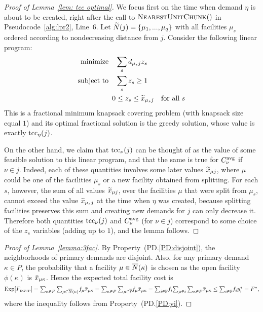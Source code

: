 \documentclass[11pt]{article}
\begin{document}

\begin{proof}[Proof of Lemma~\ref{lem: tcc optimal}]
  We focus first on the time when demand $\eta$ is about to be created,
  right after the call to ${\textsc{NearestUnitChunk}}()$ in
  Pseudocode~\ref{alg:lpr2}, Line~6.  Let ${\widetilde N}(j) =
  \{\mu_1,...,\mu_q\}$ with all facilities $\mu_s$ ordered
  according to nondecreasing distance from $j$.  Consider
  the following linear program:
%
\begin{alignat*}{1}
	\textrm{minimize} \quad & \sum_s d_{\mu_s j}z_s
			\\
	\textrm{subject to} \quad & \sum_s z_s  \ge 1
			\\
 	0 &\le z_s \le {\widetilde x}_{\mu_s j} \quad \textrm{for all}\ s
\end{alignat*}
%
  This is a fractional
  minimum knapsack covering problem (with knapsack size equal $1$) and its optimal fractional
  solution is the greedy solution, whose value is exactly
  $\textrm{tcc}_\eta(j)$.  

On the other hand, we claim that
  $\textrm{tcc}_\nu(j)$ can be thought of as the value of some feasible
  solution to this linear program, and that the same is true for $C^{{\mbox{\scriptsize\rm avg}}}_{\nu}$ if $\nu\in j$.
  Indeed, each of these
  quantities involves some later values ${\widetilde x}_{\mu j}$,
  where $\mu$ could be one of the facilities $\mu_s$ or a
  new facility obtained from splitting. For each $s$,
  however, the sum of all values ${\widetilde x}_{\mu j}$,
  over the facilities $\mu$ that were split from $\mu_s$, cannot exceed
 the value ${\widetilde x}_{\mu_s j}$ at the time when
  $\eta$ was created, because splitting facilities preserves this sum and
 creating new demands for $j$ can only decrease it.
Therefore both quantities
  $\textrm{tcc}_\nu(j)$ and $C^{{\mbox{\scriptsize\rm avg}}}_{\nu}$ (for $\nu\in j$) correspond to some
  choice of the $z_s$ variables (adding up to $1$), and the
  lemma follows.
\end{proof}

\begin{proof}[Proof of Lemma~\ref{lemma:3fac}]
  By Property~(PD.\ref{PD:disjoint}), the neighborhoods of
  primary demands are disjoint. Also, for any primary demand
  $\kappa\in P$, the probability that a facility
  $\mu\in{\overline{N}}(\kappa)$ is chosen as the open facility
  $\phi(\kappa)$ is ${\bar x}_{\mu\kappa}$. Hence the expected
  total facility cost is
%
\begin{equation*}
    \mbox{\rm Exp}[F_{\mbox{\tiny\rm EGUP}}]
	= \textstyle{\sum_{\kappa\in P}\sum_{\mu\in{\overline{N}}(\kappa)}} f_{\mu} {\bar x}_{\mu\kappa}
	= \textstyle{\sum_{\kappa\in P}\sum_{\mu\in\overline{\mathbb{F}}}} f_{\mu} {\bar x}_{\mu\kappa} 
	= \textstyle{\sum_{i\in\mathbb{F}}} f_i \textstyle{\sum_{\mu\in i}\sum_{\kappa\in P}} {\bar x}_{\mu\kappa} 
	\leq \textstyle{\sum_{i\in\mathbb{F}}} f_i y_i^\ast 
	= F^\ast,
\end{equation*}
%
where the inequality follows from Property~(PD.\ref{PD:yi}).
\end{proof}
\end{document}
